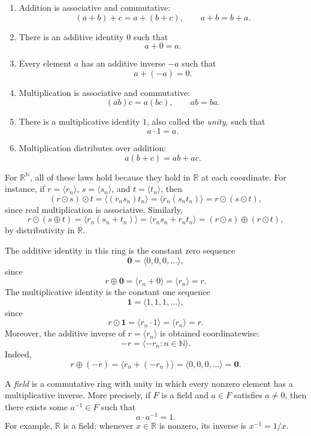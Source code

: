 \begin{enumerate}
    \item Addition is associative and commutative:
    \[
    (a+b)+c=a+(b+c),
    \qquad
    a+b=b+a.
    \]

    \item There is an additive identity \(0\) such that
    \[
    a+0=a.
    \]

    \item Every element \(a\) has an additive inverse \(-a\) such that
    \[
    a+(-a)=0.
    \]

    \item Multiplication is associative and commutative:
    \[
    (ab)c=a(bc),
    \qquad
    ab=ba.
    \]

    \item There is a multiplicative identity \(1\), also called the
    \emph{unity}, such that
    \[
    a\cdot 1=a.
    \]

    \item Multiplication distributes over addition:
    \[
    a(b+c)=ab+ac.
    \]
\end{enumerate}

For \(\mathbb{R}^{\mathbb{N}}\), all of these laws hold because they hold in
\(\mathbb{R}\) at each coordinate. For instance, if
\(r=\langle r_n\rangle\), \(s=\langle s_n\rangle\), and
\(t=\langle t_n\rangle\), then
\[
(r\odot s)\odot t
=
\langle (r_ns_n)t_n\rangle
=
\langle r_n(s_nt_n)\rangle
=
r\odot(s\odot t),
\]
since real multiplication is associative. Similarly,
\[
r\odot(s\oplus t)
=
\langle r_n(s_n+t_n)\rangle
=
\langle r_ns_n+r_nt_n\rangle
=
(r\odot s)\oplus(r\odot t),
\]
by distributivity in \(\mathbb{R}\).

The additive identity in this ring is the constant zero sequence
\[
\mathbf{0}=\langle 0,0,0,\ldots\rangle,
\]
since
\[
r\oplus\mathbf{0}
=
\langle r_n+0\rangle
=
\langle r_n\rangle
=
r.
\]
The multiplicative identity is the constant one sequence
\[
\mathbf{1}=\langle 1,1,1,\ldots\rangle,
\]
since
\[
r\odot\mathbf{1}
=
\langle r_n\cdot 1\rangle
=
\langle r_n\rangle
=
r.
\]
Moreover, the additive inverse of
\(r=\langle r_n\rangle\) is obtained coordinatewise:
\[
-r=\langle-r_n:n\in\mathbb{N}\rangle.
\]
Indeed,
\[
r\oplus(-r)
=
\langle r_n+(-r_n)\rangle
=
\langle 0,0,0,\ldots\rangle
=
\mathbf{0}.
\]

A \emph{field} is a commutative ring with unity in which every nonzero
element has a multiplicative inverse. More precisely, if \(F\) is a field
and \(a\in F\) satisfies \(a\neq 0\), then there exists some
\(a^{-1}\in F\) such that
\[
a\cdot a^{-1}=1.
\]
For example, \(\mathbb{R}\) is a field: whenever \(x\in\mathbb{R}\) is
nonzero, its inverse is \(x^{-1}=1/x\).


